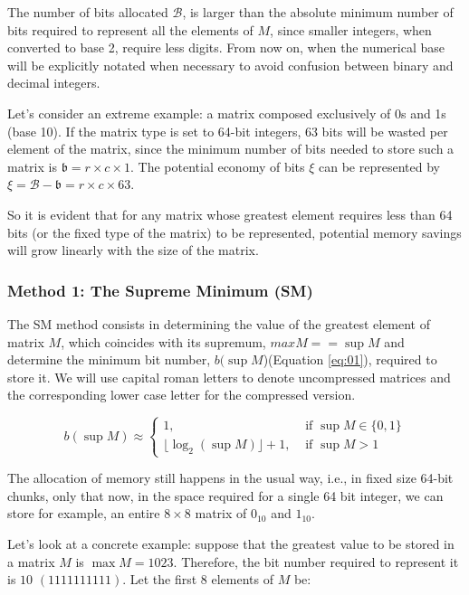 \documentclass[10pt]{article}
\begin{document}
The number of bits allocated $\mathcal{B}$, is larger than the absolute minimum number of bits required to represent all the elements of $M$, since smaller integers, when converted to base 2, require less digits. From now on, when the numerical base will be explicitly notated when necessary to avoid confusion between binary and decimal integers.  

Let's consider an extreme example: a matrix composed exclusively of 0s and 1s (base 10). If the matrix type is set to 64-bit integers, 63 bits will be wasted per element of the matrix, since the minimum number of bits needed to store such a matrix is $\mathfrak{b} = r \times c \times 1$. The potential economy of bits $\xi$ can be represented by $\xi = \mathcal{B} - \mathfrak{b} =  r \times c \times 63$.


So it is evident that for any matrix whose greatest element requires less than 64 bits (or the fixed type of the matrix) to be represented, potential memory savings will grow linearly with the size of the matrix.

\subsubsection*{Method 1: The Supreme Minimum (SM)}

The SM method consists in determining the value of the greatest element of matrix $M$, which coincides with its supremum, $max M == \sup M$  and determine the minimum bit number, $b(\sup M$)(Equation \ref{eq:01}), required to store it. We will use capital roman letters to denote uncompressed matrices and the corresponding lower case letter for the compressed version.

\begin{equation} \label{eq:01}
 b(\sup M) \approx \begin{cases}
	1, &  \text{ if } \sup M \in \{0,1\} \\ 
	\lfloor \log_2(\sup M)  \rfloor + 1,  & \text{ if } \sup M > 1  
	\end{cases}
\end{equation}

The allocation of memory still happens in the usual way, i.e., in fixed size 64-bit chunks, only that now, in the space required for a single 64 bit integer, we can store for example, an entire $8\times 8$ matrix of $0_{10}$ and $1_{10}$. 

Let's look at a concrete example: suppose that the greatest value to be stored in a matrix $M$ is $\max M=1023$. Therefore, the bit number required to represent it is $10$ $(1111111111)$. Let the first 8 elements of $M$ be:
\end{document}
